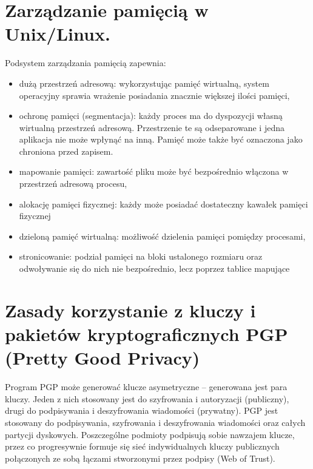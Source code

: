 \documentclass[12pt,a4paper]{article}
\begin{document}
	\section{Zarządzanie pamięcią w Unix/Linux.}
	Podsystem zarządzania pamięcią zapewnia:
	\begin{itemize}
		\item 	dużą przestrzeń adresową: wykorzystując pamięć wirtualną, system operacyjny sprawia wrażenie posiadania znacznie większej ilości pamięci,
		\item ochronę pamięci (segmentacja): każdy proces ma do dyspozycji własną wirtualną przestrzeń adresową. Przestrzenie te są odseparowane i jedna aplikacja nie może wpłynąć na inną. Pamięć może także być oznaczona jako chroniona przed zapisem.
		\item mapowanie pamięci: zawartość pliku może być bezpośrednio włączona w przestrzeń adresową procesu,
		\item alokację pamięci fizycznej: każdy może posiadać dostateczny kawałek pamięci fizycznej
		\item dzieloną pamięć wirtualną: możliwość dzielenia pamięci pomiędzy procesami,
		\item stronicowanie: podział pamięci na bloki ustalonego rozmiaru oraz odwoływanie się do nich nie bezpośrednio, lecz poprzez tablice mapujące
	\end{itemize}

	\section{Zasady korzystanie z kluczy i pakietów kryptograficznych PGP (Pretty Good Privacy)}
	Program PGP może generować klucze asymetryczne -- generowana jest para kluczy. Jeden z nich stosowany jest do szyfrowania i autoryzacji (publiczny), drugi do podpisywania i deszyfrowania wiadomości (prywatny). PGP jest stosowany do podpisywania, szyfrowania i deszyfrowania wiadomości oraz całych partycji dyskowych. Poszczególne podmioty podpisują sobie nawzajem klucze, przez co progresywnie formuje się sieć indywidualnych kluczy publicznych połączonych ze sobą łączami stworzonymi przez podpisy (Web of Trust).
\end{document}
